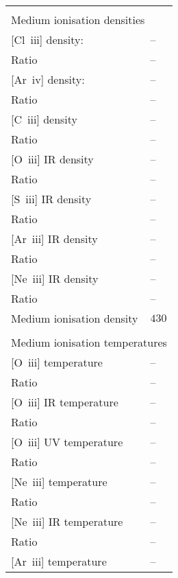 \begin{longtable}[l]{ll}
 \vspace{0.2cm}\\\multicolumn{2}{l}{Medium ionisation densities}\\ \hline
 {}[Cl~{\sc iii}] density:           & -- \\
 Ratio                               & -- \\
 {}[Ar~{\sc iv}] density:            & -- \\
 Ratio                               & -- \\
 {}[C~{\sc iii}] density             & -- \\
 Ratio                               & -- \\
 {}[O~{\sc iii}] IR density          & -- \\
 Ratio                               & -- \\
 {}[S~{\sc iii}] IR density          & -- \\
 Ratio                               & -- \\
 {}[Ar~{\sc iii}] IR density         & -- \\
 Ratio                               & -- \\
 {}[Ne~{\sc iii}] IR density         & -- \\
 Ratio                               & -- \\
 Medium ionisation density           & $  430$\\
 \vspace{0.2cm}\\\multicolumn{2}{l}{Medium ionisation temperatures}\\ \hline
 {}[O~{\sc iii}] temperature         & -- \\
 Ratio                               & -- \\
 {}[O~{\sc iii}] IR temperature      & -- \\
 Ratio                               & -- \\
 {}[O~{\sc iii}] UV temperature      & -- \\
 Ratio                               & -- \\
 {}[Ne~{\sc iii}] temperature        & -- \\
 Ratio                               & -- \\
 {}[Ne~{\sc iii}] IR temperature     & -- \\
 Ratio                               & -- \\
 {}[Ar~{\sc iii}] temperature        & -- \\

\end{longtable}
